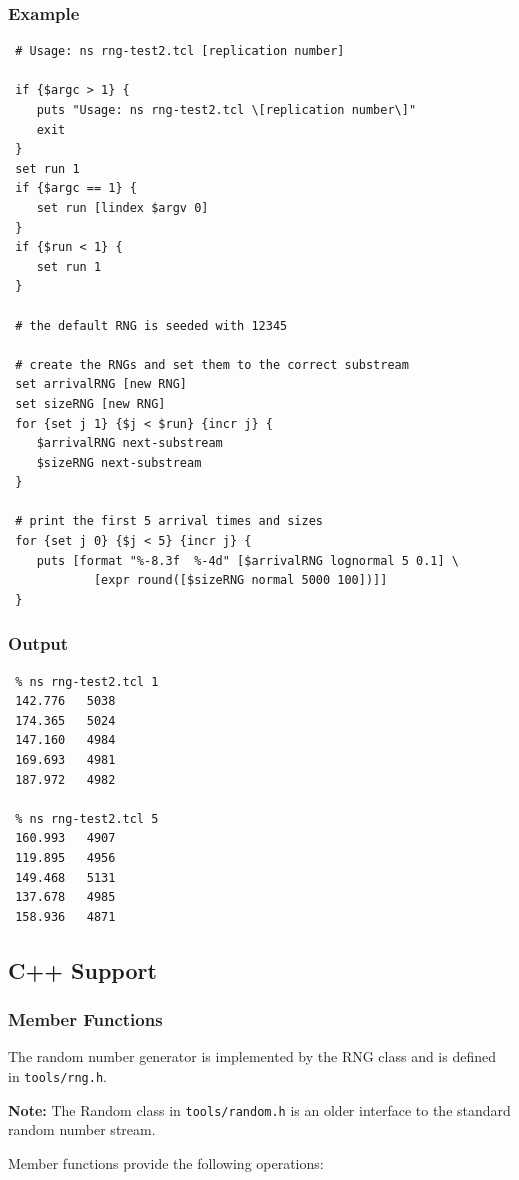 \subsubsection{Example}

\begin{verbatim}
 # Usage: ns rng-test2.tcl [replication number]

 if {$argc > 1} {
    puts "Usage: ns rng-test2.tcl \[replication number\]"
    exit
 }
 set run 1
 if {$argc == 1} {
    set run [lindex $argv 0]
 }
 if {$run < 1} {
    set run 1
 }

 # the default RNG is seeded with 12345

 # create the RNGs and set them to the correct substream
 set arrivalRNG [new RNG]
 set sizeRNG [new RNG]
 for {set j 1} {$j < $run} {incr j} {
    $arrivalRNG next-substream
    $sizeRNG next-substream
 }

 # print the first 5 arrival times and sizes
 for {set j 0} {$j < 5} {incr j} {
    puts [format "%-8.3f  %-4d" [$arrivalRNG lognormal 5 0.1] \
            [expr round([$sizeRNG normal 5000 100])]]
 }
\end{verbatim}

\subsubsection{Output}

\begin{verbatim}
 % ns rng-test2.tcl 1
 142.776   5038
 174.365   5024
 147.160   4984
 169.693   4981
 187.972   4982

 % ns rng-test2.tcl 5
 160.993   4907
 119.895   4956
 149.468   5131
 137.678   4985
 158.936   4871
\end{verbatim}

\subsection{C++ Support}

\subsubsection{Member Functions}
The random number generator is implemented by the RNG class and is
defined in {\tt tools/rng.h}.

{\bf Note:} The Random class in {\tt tools/random.h} is an older
interface to the standard random number stream.

Member functions provide the following operations:

